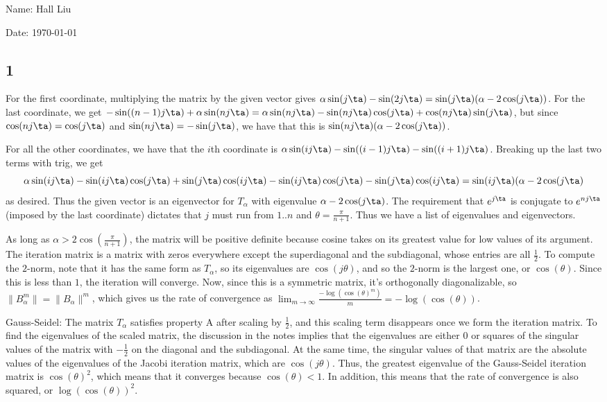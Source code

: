 \documentclass{article}
\begin{document}
Name: Hall Liu

Date: \today 
\vspace{1.5cm}
\subsection*{1}
For the first coordinate, multiplying the matrix by the given vector gives $\alpha\sin(j\ta)-\sin(2j\ta)=\sin(j\ta)(\alpha-2\cos(j\ta))$. For the last coordinate, we get $-\sin((n-1)j\ta)+\alpha\sin(nj\ta)=\alpha\sin(nj\ta)-\sin(nj\ta)\cos(j\ta)+\cos(nj\ta)\sin(j\ta)$, but since $\cos(nj\ta)=\cos(j\ta)$ and $\sin(nj\ta)=-\sin(j\ta)$, we have that this is $\sin(nj\ta)(\alpha-2\cos(j\ta))$.

For all the other coordinates, we have that the $i$th coordinate is $\alpha\sin(ij\ta)-\sin((i-1)j\ta)-\sin((i+1)j\ta)$. Breaking up the last two terms with trig, we get 
\[\alpha\sin(ij\ta)-\sin(ij\ta)\cos(j\ta)+\sin(j\ta)\cos(ij\ta)-\sin(ij\ta)\cos(j\ta)-\sin(j\ta)\cos(ij\ta)=\sin(ij\ta)(\alpha-2\cos(j\ta)\]
as desired. Thus the given vector is an eigenvector for $T_\alpha$ with eigenvalue $\alpha-2\cos(j\ta)$. The requirement that $e^{j\ta}$ is conjugate to $e^{nj\ta}$ (imposed by the last coordinate) dictates that $j$ must run from $1..n$ and $\theta=\frac{\pi}{n+1}$. Thus we have a list of eigenvalues and eigenvectors.

As long as $\alpha>2\cos(\frac{\pi}{n+1})$, the matrix will be positive definite because cosine takes on its greatest value for low values of its argument.
The iteration matrix is a matrix with zeros everywhere except the superdiagonal and the subdiagonal, whose entries are all $\frac{1}{2}$. To compute the $2$-norm, note that it has the same form as $T_\alpha$, so its eigenvalues are $\cos(j\theta)$, and so the $2$-norm is the largest one, or $\cos(\theta)$. Since this is less than $1$, the iteration will converge. Now, since this is a symmetric matrix, it's orthogonally diagonalizable, so $\|B_\alpha^m\|=\|B_\alpha\|^m$, which gives us the rate of convergence as $\lim_{m\to\infty}\frac{-\log(\cos(\theta)^m)}{m}=-\log(\cos(\theta))$.

Gauss-Seidel: The matrix $T_\alpha$ satisfies property A after scaling by $\frac{1}{2}$, and this scaling term disappears once we form the iteration matrix. To find the eigenvalues of the scaled matrix, the discussion in the notes implies that the eigenvalues are either $0$ or squares of the singular values of the matrix with $-\frac{1}{2}$ on the diagonal and the subdiagonal. At the same time, the singular values of that matrix are the absolute values of the eigenvalues of the Jacobi iteration matrix, which are $\cos(j\theta)$. Thus, the greatest eigenvalue of the Gauss-Seidel iteration matrix is $\cos(\theta)^2$, which means that it converges because $\cos(\theta)<1$. In addition, this means that the rate of convergence is also squared, or $\log(\cos(\theta))^2$.
\end{document}
